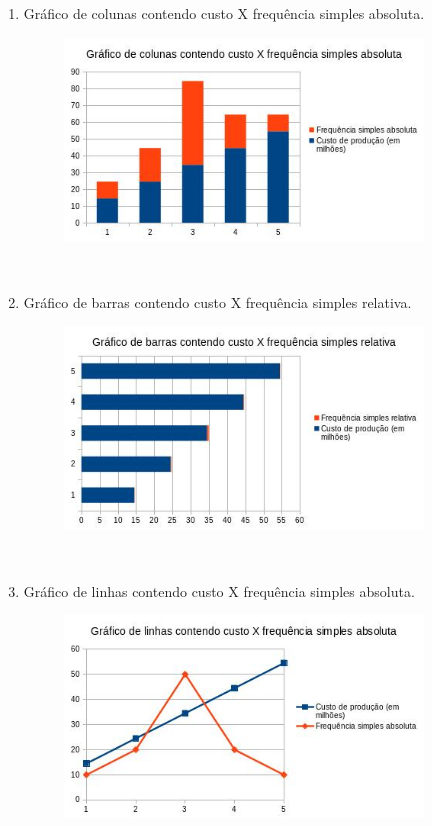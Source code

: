 \documentclass[a4paper, 12pt]{article}
\begin{document}
\begin{enumerate}
\begin{enumerate}
  \item Gráfico de colunas contendo custo X frequência simples absoluta.
   \begin{figure}[h!]
   \centering
   \includegraphics[width=0.9\textwidth]{3}
   \end{figure} \\

\newpage

 \item Gráfico de barras contendo custo X frequência simples relativa.
   \begin{figure}[h!]
   \centering
   \includegraphics[width=0.9\textwidth]{4}
   \end{figure} \\

\newpage
   
 \item Gráfico de linhas contendo custo X frequência simples absoluta.
   \begin{figure}[h!]
   \centering
   \includegraphics[width=0.9\textwidth]{5}
   \end{figure} \\


\end{enumerate}
\end{enumerate}
\end{document}
